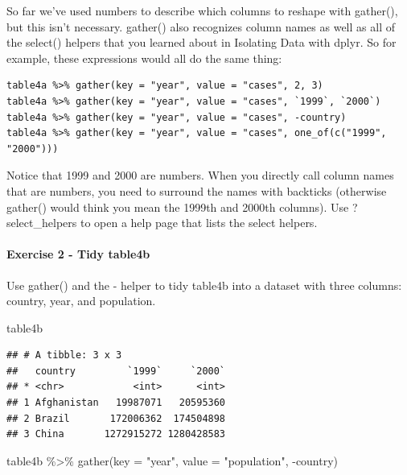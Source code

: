 \documentclass[
]{article}
\newenvironment{Shaded}{\begin{snugshade}}{\end{snugshade}}
\newcommand{\AttributeTok}[1]{\textcolor[rgb]{0.77,0.63,0.00}{#1}}
\newcommand{\FunctionTok}[1]{\textcolor[rgb]{0.00,0.00,0.00}{#1}}
\newcommand{\NormalTok}[1]{#1}
\newcommand{\SpecialCharTok}[1]{\textcolor[rgb]{0.00,0.00,0.00}{#1}}
\newcommand{\StringTok}[1]{\textcolor[rgb]{0.31,0.60,0.02}{#1}}
\begin{document}
So far we've used numbers to describe which columns to reshape with
gather(), but this isn't necessary. gather() also recognizes column
names as well as all of the select() helpers that you learned about in
Isolating Data with dplyr. So for example, these expressions would all
do the same thing:

\begin{verbatim}
table4a %>% gather(key = "year", value = "cases", 2, 3)
table4a %>% gather(key = "year", value = "cases", `1999`, `2000`)
table4a %>% gather(key = "year", value = "cases", -country)
table4a %>% gather(key = "year", value = "cases", one_of(c("1999", "2000")))
\end{verbatim}

Notice that 1999 and 2000 are numbers. When you directly call column
names that are numbers, you need to surround the names with backticks
(otherwise gather() would think you mean the 1999th and 2000th columns).
Use ?select\_helpers to open a help page that lists the select helpers.

\hypertarget{exercise-2---tidy-table4b}{%
\paragraph{Exercise 2 - Tidy table4b}\label{exercise-2---tidy-table4b}}

Use gather() and the - helper to tidy table4b into a dataset with three
columns: country, year, and population.

\begin{Shaded}
\begin{Highlighting}[]
\NormalTok{table4b}
\end{Highlighting}
\end{Shaded}

\begin{verbatim}
## # A tibble: 3 x 3
##   country         `1999`     `2000`
## * <chr>            <int>      <int>
## 1 Afghanistan   19987071   20595360
## 2 Brazil       172006362  174504898
## 3 China       1272915272 1280428583
\end{verbatim}

\begin{Shaded}
\begin{Highlighting}[]
\NormalTok{table4b }\SpecialCharTok{\%\textgreater{}\%} \FunctionTok{gather}\NormalTok{(}\AttributeTok{key =} \StringTok{"year"}\NormalTok{, }\AttributeTok{value =} \StringTok{"population"}\NormalTok{, }\SpecialCharTok{{-}}\NormalTok{country)}
\end{Highlighting}
\end{Shaded}
\end{document}
